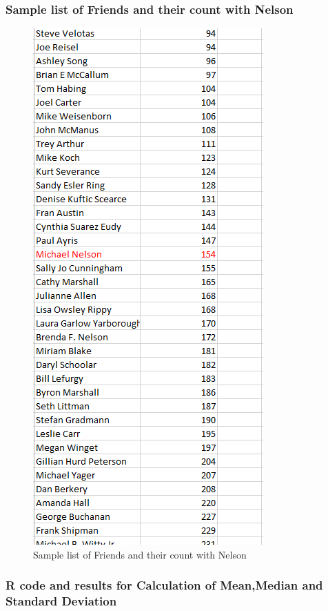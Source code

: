 \subsubsection{Sample list of Friends and their count with Nelson}
\begin{figure}[ht]    
    \begin{center}
        \includegraphics[scale=0.9]{frnds_with_source_fb.png}
        \caption{Sample list of Friends and their count with Nelson}
        \label{Sample list2}
    \end{center}
\end{figure}
\newpage
\subsubsection{R code and results for Calculation of Mean,Median and Standard Deviation}


